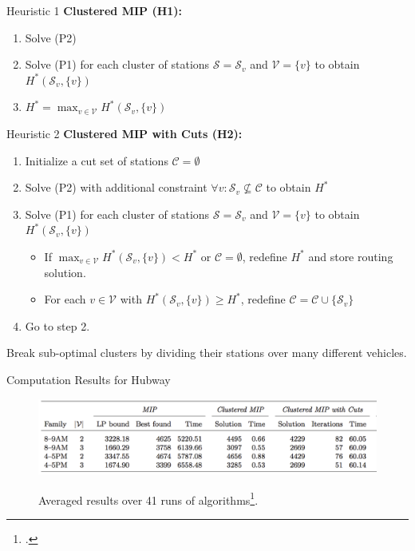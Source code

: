     \begin{frame}{Heuristic 1}
    \textbf{Clustered MIP (H1):} 
    \begin{enumerate}
        \item Solve (P2)
        \item Solve (P1) for each cluster of stations $\mathcal{S} = \mathcal{S}_v$ and $\mathcal{V} = \{v\}$ to obtain $H^*(\mathcal{S}_v, \{v\})$
        \item $H^* = \max_{v \in \mathcal{V}}H^*(\mathcal{S}_v, \{v\})$
    \end{enumerate}
    \end{frame}
    \begin{frame}{Heuristic 2}
    \textbf{Clustered MIP with Cuts (H2):}
    \begin{enumerate}
        \item Initialize a cut set of stations $\mathcal{C} = \emptyset$
        \item Solve (P2) with additional constraint $\forall v: \mathcal{S}_v \not \subseteq \mathcal{C}$ to obtain $H^*$
        \item Solve (P1) for each cluster of stations $\mathcal{S} = \mathcal{S}_v$ and $\mathcal{V} = \{v\}$ to obtain $H^*(\mathcal{S}_v, \{v\})$
            \begin{itemize}
                \item If $\max_{v \in \mathcal{V}}H^*(\mathcal{S}_v, \{v\}) < H^*$ or $\mathcal{C}=\emptyset$, redefine $H^*$ and store routing solution.
                \item For each $v \in \mathcal{V}$ with $H^*(\mathcal{S}_v, \{v\}) \geq H^*$, redefine $\mathcal{C} = \mathcal{C} \cup \{\mathcal{S}_v\}$ 
            \end{itemize}
        \item Go to step 2.
    \end{enumerate}
    \pause
    \alert{Break sub-optimal clusters by dividing their stations over many different vehicles.}
    \end{frame}

    \begin{frame}{Computation Results for Hubway}
        \begin{figure}
            \centering
            {\includegraphics[scale=0.28]{plots/clustered_MIP.png}}
            \caption{Averaged results over 41 runs of algorithms\footcite{schuijbroek2017inventory}.}
        \end{figure}
    \end{frame}

